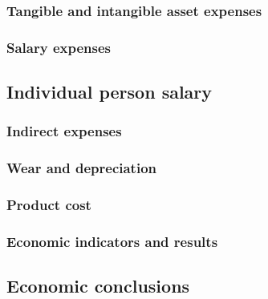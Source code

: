 \subsubsection{Tangible and intangible asset expenses}
\subsubsection{Salary expenses}
\subsection{Individual person salary}
\subsubsection{Indirect expenses}
\subsubsection{Wear and depreciation}
\subsubsection{Product cost}
\subsubsection{Economic indicators and results}
\subsection{Economic conclusions}